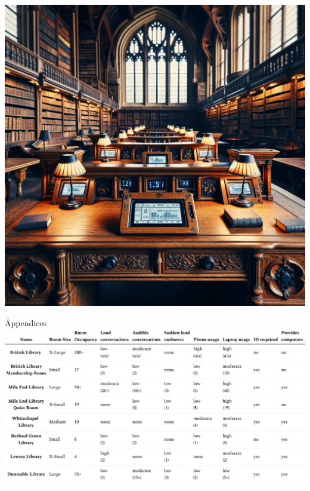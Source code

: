 \documentclass{novel}
\begin{document}
\begin{minipage}{0.33\textwidth}
    \includegraphics[width=1\textwidth]{resources/deskDevice.jpg}
\end{minipage}
\restoregeometry


\h{Appendices}
    \centering
\includegraphics[width=\dimexpr\paperwidth-4cm\relax]{resources/numData.pdf}
\restoregeometry
\end{document}
